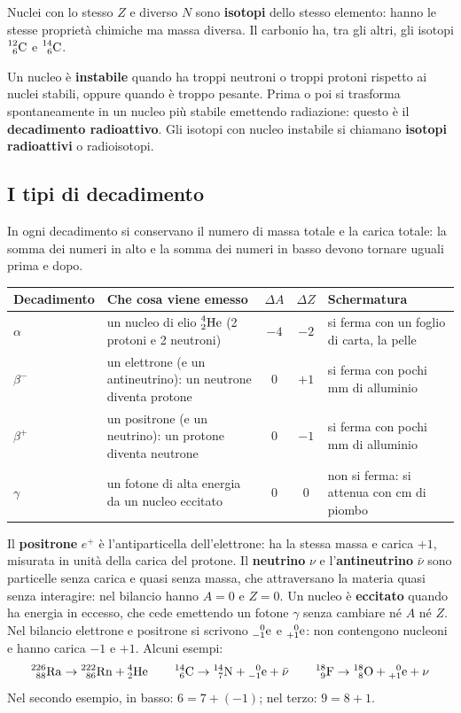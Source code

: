 Nuclei con lo stesso $Z$ e diverso $N$ sono \textbf{isotopi} dello stesso elemento: hanno le stesse proprietà chimiche ma massa diversa. Il carbonio ha, tra gli altri, gli isotopi $\prescript{12}{6}{\mathrm{C}}$ e $\prescript{14}{6}{\mathrm{C}}$.

Un nucleo è \textbf{instabile} quando ha troppi neutroni o troppi protoni rispetto ai nuclei stabili, oppure quando è troppo pesante. Prima o poi si trasforma spontaneamente in un nucleo più stabile emettendo radiazione: questo è il \textbf{decadimento radioattivo}. Gli isotopi con nucleo instabile si chiamano \textbf{isotopi radioattivi} o radioisotopi.

\subsection{I tipi di decadimento}

In ogni decadimento si conservano il numero di massa totale e la carica totale: la somma dei numeri in alto e la somma dei numeri in basso devono tornare uguali prima e dopo.

\begin{center}
\small
\begin{tabularx}{\linewidth}{@{}l X c c l@{}}
\toprule
Decadimento & Che cosa viene emesso & $\Delta A$ & $\Delta Z$ & Schermatura \\
\midrule
$\alpha$ & un nucleo di elio $\prescript{4}{2}{\mathrm{He}}$ (2 protoni e 2 neutroni) & $-4$ & $-2$ & si ferma con un foglio di carta, la pelle \\
$\beta^-$ & un elettrone (e un antineutrino): un neutrone diventa protone & $0$ & $+1$ & si ferma con pochi mm di alluminio \\
$\beta^+$ & un positrone (e un neutrino): un protone diventa neutrone & $0$ & $-1$ & si ferma con pochi mm di alluminio \\
$\gamma$ & un fotone di alta energia da un nucleo eccitato & $0$ & $0$ & non si ferma: si attenua con cm di piombo \\
\bottomrule
\end{tabularx}
\end{center}

Il \textbf{positrone} $e^+$ è l'antiparticella dell'elettrone: ha la stessa massa e carica $+1$, misurata in unità della carica del protone. Il \textbf{neutrino} $\nu$ e l'\textbf{antineutrino} $\bar\nu$ sono particelle senza carica e quasi senza massa, che attraversano la materia quasi senza interagire: nel bilancio hanno $A = 0$ e $Z = 0$. Un nucleo è \textbf{eccitato} quando ha energia in eccesso, che cede emettendo un fotone $\gamma$ senza cambiare né $A$ né $Z$. Nel bilancio elettrone e positrone si scrivono $\prescript{0}{-1}{\mathrm{e}}$ e $\prescript{0}{+1}{\mathrm{e}}$: non contengono nucleoni e hanno carica $-1$ e $+1$. Alcuni esempi:
\[
  \prescript{226}{88}{\mathrm{Ra}} \to \prescript{222}{86}{\mathrm{Rn}} + \prescript{4}{2}{\mathrm{He}}
  \qquad
  \prescript{14}{6}{\mathrm{C}} \to \prescript{14}{7}{\mathrm{N}} + \prescript{0}{-1}{\mathrm{e}} + \bar\nu
  \qquad
  \prescript{18}{9}{\mathrm{F}} \to \prescript{18}{8}{\mathrm{O}} + \prescript{0}{+1}{\mathrm{e}} + \nu
\]
Nel secondo esempio, in basso: $6 = 7 + (-1)$; nel terzo: $9 = 8 + 1$.

